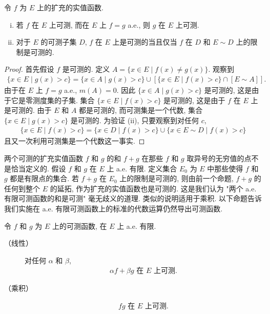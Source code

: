 \documentclass[../../main.tex]{subfiles}
\begin{document}
\begin{proposition}\label{proposition:ch03-a.e.可测}
令 $f$ 为 $E$ 上的扩充的实值函数.
\begin{enumerate}[(i)]
\item 若 $f$ 在 $E$ 上可测, 而在 $E$ 上 $f=g$ a.e., 则 $g$ 在 $E$ 上可测.
\item 对于 $E$ 的可测子集 $D$, $f$ 在 $E$ 上是可测的当且仅当 $f$ 在 $D$ 和 $E\sim D$ 上的限制是可测的.
\end{enumerate}
\end{proposition}

\begin{proof}
首先假设 $f$ 是可测的. 定义 $A=\{x\in E\mid f(x)\neq g(x)\}$. 观察到
\begin{align*}
\{x\in E\mid g(x)>c\}=\{x\in A\mid g(x)>c\}\cup[\{x\in E\mid f(x)>c\}\cap[E\sim A]].
\end{align*}
由于在 $E$ 上 $f=g$ a.e., $m(A)=0$. 因此 $\{x\in A\mid g(x)>c\}$ 是可测的, 这是由于它是零测度集的子集. 集合 $\{x\in E\mid f(x)>c\}$ 是可测的, 这是由于 $f$ 在 $E$ 上是可测的. 由于 $E$ 和 $A$ 都是可测的, 而可测集是一个代数, 集合 $\{x\in E\mid g(x)>c\}$ 是可测的. 为验证 (ii), 只要观察到对任何 $c$,
\begin{align*}
\{x\in E\mid f(x)>c\}=\{x\in D\mid f(x)>c\}\cup\{x\in E\sim D\mid f(x)>c\}
\end{align*}
且又一次利用可测集是一个代数这一事实.
\end{proof}

两个可测的扩充实值函数 $f$ 和 $g$ 的和 $f+g$ 在那些 $f$ 和 $g$ 取异号的无穷值的点不是恰当定义的. 假设 $f$ 和 $g$ 在 $E$ 上 a.e. 有限. 定义集合 $E_{0}$ 为 $E$ 中那些使得 $f$ 和 $g$ 都是有限点的集合. 若 $f+g$ 在 $E_{0}$ 上的限制是可测的, 则由前一个命题, $f+g$ 的任何到整个 $E$ 的延拓, 作为扩充的实值函数也是可测的. 这是我们认为 "两个 a.e. 有限可测函数的和是可测" 毫无歧义的道理. 类似的说明适用于乘积. 以下命题告诉我们实施在 a.e. 有限可测函数上的标准的代数运算仍然导出可测函数.

\begin{theorem}\label{theorem:ch03-代数可测}
令 $f$ 和 $g$ 为 $E$ 上的可测函数, 在 $E$ 上 a.e. 有限.
\begin{description}
\item[（线性）] 对任何 $\alpha$ 和 $\beta$,
\begin{align*}
\alpha f+\beta g\text{ 在 }E\text{ 上可测}.
\end{align*}
\item[（乘积）]
\begin{align*}
fg\text{ 在 }E\text{ 上可测}.
\end{align*}
\end{description}
\end{theorem}
\end{document}
